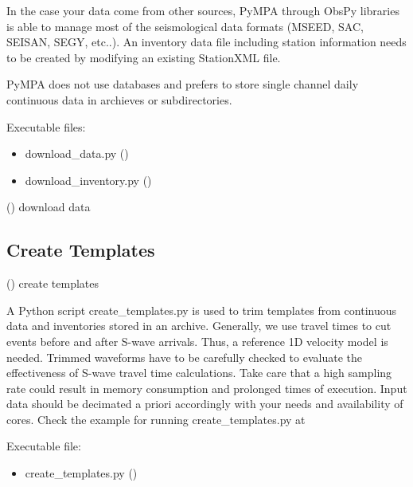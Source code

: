 \documentclass[a4paper,10pt,english]{sphinxmanual}
\begin{document}
In the case your data come from other sources, PyMPA through ObsPy libraries
is able to manage most of the seismological data formats (MSEED, SAC, SEISAN, SEGY, etc..).
An inventory data file including station information needs to be created by modifying an existing
StationXML file.

PyMPA does not use databases and prefers to store single channel daily continuous data in archieves or subdirectories.

Executable files:
\begin{itemize}
\item {} 
download\_data.py ()

\item {} 
download\_inventory.py ()

\end{itemize}

({\hyperref[\detokenize{sub/input.download_data::doc}]{}}) download data


\subsection{Create Templates}
\label{\detokenize{tutorial:create-templates}}
({\hyperref[\detokenize{sub/input.create_templates::doc}]{}}) create templates

A Python script create\_templates.py is used to trim templates from continuous data and inventories
stored in an archive. Generally, we use travel times to cut events before and after S-wave arrivals.
Thus, a reference 1D velocity model is needed. Trimmed waveforms have to be carefully checked to evaluate
the effectiveness of S-wave travel time calculations.
Take care that a high sampling rate could result in memory consumption
and prolonged times of execution.
Input data should be decimated a priori accordingly with your needs and availability of cores.
Check the example for running create\_templates.py at 

Executable file:
\begin{itemize}
\item {} 
create\_templates.py ()

\end{itemize}
\end{document}
